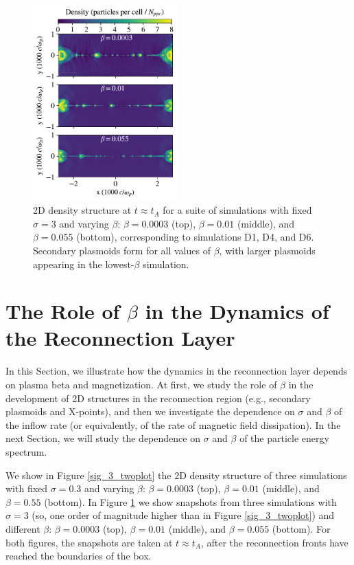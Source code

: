 \begin{figure}[!h]
	\centering
	\includegraphics[width =0.5\textwidth]{sig3_threeplot.pdf}
	\caption{2D density structure  at $t\approx t_{A}$ for a suite of simulations with fixed $\sigma=3$ and varying $\beta$: $\beta=0.0003$ (top), $\beta=0.01$ (middle), and $\beta=0.055$ (bottom), corresponding to simulations D1, D4, and D6.  Secondary plasmoids form for all values of $\beta$, with larger plasmoids appearing in the lowest-$\beta$ simulation.}
    \label{sig3_twoplot}
\end{figure}


\section{The Role of $\beta$ in the Dynamics of the Reconnection Layer}\label{role_of_beta}
In this Section, we illustrate how the dynamics in the reconnection layer depends on plasma beta and magnetization. At first, we study the role of $\beta$ in the  development of 2D structures  in the reconnection region (e.g., secondary plasmoids and X-points), and then we investigate the dependence on $\sigma$ and $\beta$ of the inflow rate (or equivalently, of the rate of magnetic field dissipation). In the next Section, we will study the dependence on $\sigma$ and $\beta$ of the particle energy spectrum.

We show in Figure \ref{sig_3_twoplot} the 2D density structure of three simulations with fixed $\sigma=0.3$ and varying $\beta$: $\beta=0.0003$ (top), $\beta=0.01$ (middle), and $\beta=0.55$ (bottom).  In Figure \ref{sig3_twoplot} we show snapshots from three simulations with $\sigma=3$ (so, one order of magnitude higher than in Figure \ref{sig_3_twoplot}) and different $\beta$: $\beta=0.0003$ (top), $\beta=0.01$ (middle), and $\beta=0.055$ (bottom). For both figures, the snapshots are taken at $t\approx t_{A}$, after the reconnection fronts have reached the boundaries of the box.

